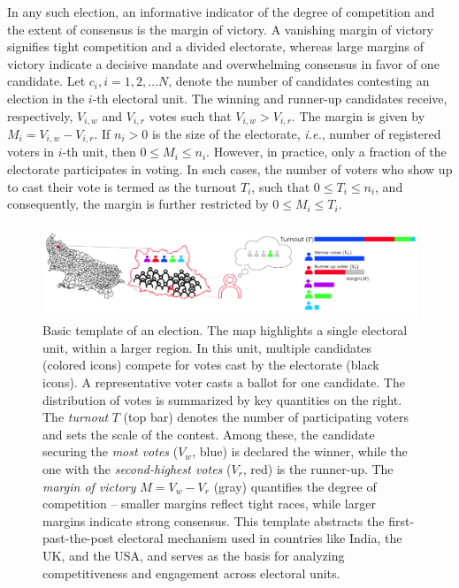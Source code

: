 In any such election, an informative indicator of the degree of competition and the extent of consensus is the margin of victory. A vanishing margin of victory signifies tight competition and a divided electorate, whereas large margins of victory indicate a decisive mandate and overwhelming consensus in favor of one candidate. Let $c_i, i=1, 2, \dots N$, denote the number of candidates contesting an election in the $i$-th electoral unit. The winning and runner-up candidates receive, respectively, $V_{i, w}$ and $V_{i, r}$ votes such that $V_{i, w} > V_{i, r}$. The margin is given by $M_i=V_{i, w}-V_{i, r}$. If $n_i > 0$ is the size of the electorate, {\it i.e.}, number of registered voters in $i$-th unit, then $0 \le M_i \le n_i$. However, in practice, only a fraction of the electorate participates in voting. In such cases, the number of voters who show up to cast their vote is termed as the turnout $T_i$, such that $0 \le T_i \le n_i$, and consequently, the margin is further restricted by $0 \le M_i \le T_i$.


\begin{figure}[h!]
    \centering
    \includegraphics[width=\textwidth]{chapters/chapter4/election_template.png}
    \caption{Basic template of an election. The map highlights a single electoral unit, within a larger region. In this unit, multiple candidates (colored icons) compete for votes cast by the electorate (black icons). A representative voter casts a ballot for one candidate. The distribution of votes is summarized by key quantities on the right. The \emph{turnout} $T$ (top bar) denotes the number of participating voters and sets the scale of the contest. Among these, the candidate securing the \emph{most votes} ($V_w$, blue) is declared the winner, while the one with the \emph{second-highest votes} ($V_r$, red) is the runner-up. The \emph{margin of victory} $M = V_w - V_r$ (gray) quantifies the degree of competition -- smaller margins reflect tight races, while larger margins indicate strong consensus. This template abstracts the first-past-the-post electoral mechanism used in countries like India, the UK, and the USA, and serves as the basis for analyzing competitiveness and engagement across electoral units.}
    \label{fig:election_template}
\end{figure}



